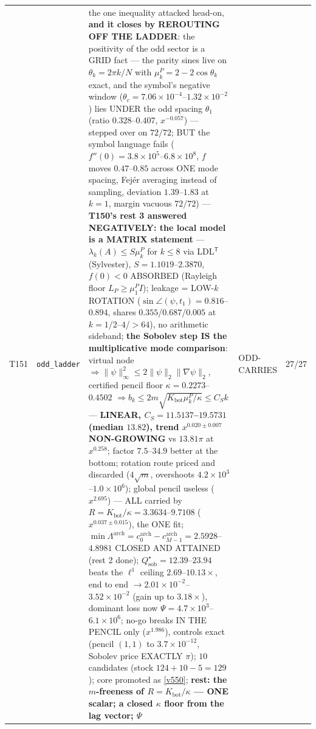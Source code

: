 \documentclass[11pt,a4paper]{article}
\begin{document}
{\begin{xltabular}{\linewidth}{@{}p{0.95cm} >{\raggedright\arraybackslash}p{3.1cm} Y >{\raggedright\scriptsize\arraybackslash}p{3.35cm} p{1.15cm}@{}}
T151 & \texttt{\scriptsize odd\_\allowbreak ladder} & the one inequality attacked head-on, \textbf{and it closes by REROUTING OFF THE LADDER}: the positivity of the odd sector is a GRID fact --- the parity sines live on $\theta_k=2\pi k/N$ with $\mu^P_k=2-2\cos\theta_k$ exact, and the symbol's negative window ($\theta_c=7.06\times10^{-4}$--$1.32\times10^{-2}$) lies UNDER the odd spacing $\theta_1$ (ratio $0.328$--$0.407$, $x^{-0.057}$) --- stepped over on $72/72$; BUT the symbol language fails ($f''(0)=3.8\times10^{5}$--$6.8\times10^{8}$, $f$ moves $0.47$--$0.85$ across ONE mode spacing, Fej\'er averaging instead of sampling, deviation $1.39$--$1.83$ at $k=1$, margin vacuous $72/72$) --- \textbf{T150's rest 3 answered NEGATIVELY: the local model is a MATRIX statement} --- $\lambda_k(A)\le S\mu^P_k$ for $k\le8$ via LDL$^{\mathsf T}$ (Sylvester), $S=1.1019$--$2.3870$, $f(0)<0$ ABSORBED (Rayleigh floor $L_P\ge\mu^P_1I$); leakage = LOW-$k$ ROTATION ($\sin\angle(\psi,t_1)=0.816$--$0.894$, shares $0.355$/$0.687$/$0.005$ at $k=1$/$2$--$4$/${>}64$), no arithmetic sideband; \textbf{the Sobolev step IS the multiplicative mode comparison}: virtual node $\Rightarrow\|\psi\|_\infty^2\le2\|\psi\|_2\|\nabla\psi\|_2$, certified pencil floor $\kappa=0.2273$--$0.4502$ $\Rightarrow b_k\le2m\sqrt{K_{\mathrm{bot}}\mu^P_k/\kappa}\le C_Sk$ --- \textbf{LINEAR, $C_S=11.5137$--$19.5731$ (median $13.82$), trend $x^{0.020\pm0.007}$ NON-GROWING} vs $13.81\pi$ at $x^{0.258}$; factor $7.5$--$34.9$ better at the bottom; rotation route priced and discarded ($4\sqrt m$, overshoots $4.2\times10^{3}$--$1.0\times10^{6}$); global pencil useless ($x^{2.695}$) --- ALL carried by $R=K_{\mathrm{bot}}/\kappa=3.3634$--$9.7108$ ($x^{0.037\pm0.015}$), the ONE fit; $\min\Lambda^{\mathrm{arch}}=c^{\mathrm{arch}}_0-c^{\mathrm{arch}}_{M-1}=2.5928$--$4.8981$ CLOSED AND ATTAINED (rest 2 done); $Q^\star_{\mathrm{sob}}=12.39$--$23.94$ beats the $\ell^1$ ceiling $2.69$--$10.13\times$, end to end $\to2.01\times10^{-2}$--$3.52\times10^{-2}$ (gain up to $3.18\times$), dominant loss now $\Psi=4.7\times10^{3}$--$6.1\times10^{6}$; no-go breaks IN THE PENCIL only ($x^{1.986}$), controls exact (pencil $(1,1)$ to $3.7\times10^{-12}$, Sobolev price EXACTLY $\pi$); $10$ candidates (stock $124+10-5=129$); core promoted as \vref{v550}; \textbf{rest: the $m$-freeness of $R=K_{\mathrm{bot}}/\kappa$ --- ONE scalar; a closed $\kappa$ floor from the lag vector; $\Psi$} & ODD-CARRIES & 27/27\\

\end{xltabular}}
\end{document}
